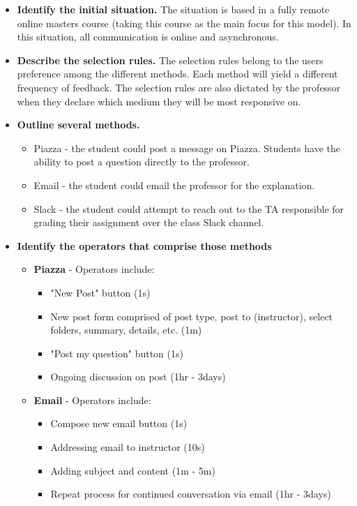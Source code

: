 \begin{itemize}
\item
  \textbf{Identify the initial situation.} The situation is based in a fully remote online masters course (taking this course as the main focus for this model). In this situation, all communication is online and asynchronous.
\item
  \textbf{Describe the selection rules.} The selection rules belong to the users preference among the different methods. Each method will yield a different frequency of feedback. The selection rules are also dictated by the professor when they declare which medium they will be most responsive on.
\item
  \textbf{Outline several methods.}
  \begin{itemize}
  \item
    Piazza - the student could post a message on Piazza. Students have the ability to post a question directly to the professor.
  \item
    Email - the student could email the professor for the explanation.
  \item
    Slack - the student could attempt to reach out to the TA responsible for grading their assignment over the class Slack channel.
  \end{itemize}
\item
  \textbf{Identify the operators that comprise those methods}
  \begin{itemize}
  \item
    \textbf{Piazza} - Operators include:
    \begin{itemize}
    \item
      "New Post" button (1s)
    \item
      New post form comprised of post type, post to (instructor), select folders, summary, details, etc.  (1m)
    \item
      "Post my question" button (1s)
    \item
      Ongoing discussion on post (1hr - 3days)
    \end{itemize}
  \item
    \textbf{Email} - Operators include:
    \begin{itemize}
    \item
      Compose new email button (1s)
    \item
      Addressing email to instructor (10s)
    \item
      Adding subject and content (1m - 5m)
    \item
      Repeat process for continued conversation via email (1hr - 3days)


\end{itemize}
\end{itemize}
\end{itemize}
